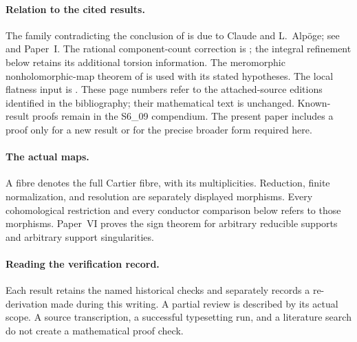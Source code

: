 \begin{abstract}
Let $f:Y\to B$ be a torus fibration from a smooth compact complex
threefold with $b_1(Y)=b_2(Y)=0$. We identify the cotangent torsion
and connecting homomorphism omitted in the singular-fibre reduction
of the Campana--Demailly--Peternell argument, and give the exact
geometric criterion for its degree-two tangent-cohomology vanishing.
The normalization target alone does not determine that cohomology:
the explicitly computed integral twists include a one-dimensional
source whose natural map to the one-dimensional target is zero.
For irreducible and normal-crossing supports, the local conductor,
monodromy and vanishing-cycle calculations give nonnegative fibre
Euler numbers and $c_3(Y)\in\{0,2\}$. The zero-Euler irreducible
singular supports have smooth minimal elliptic ruled or Hopf
normalization. We also prove the persistence of a rank-two torus
fibration under small deformations and retain the full period,
tangent-cohomology and deformation-chain calculations. The exact
comb kernel splitting remains an explicitly stated open problem.
\end{abstract}

\paragraph{Relation to the cited results.}
The family contradicting the conclusion of
\citet[Corollary~2.3, p.~2 of the attached-source edition]{CDP20} is due to Claude and L.~Alp\"oge;
see \citet[Theorem~9.1]{AC2026} and Paper~I.
The rational component-count correction is
\cite[Section~10.5, p.~91]{AC2026}; the integral refinement below
retains its additional torsion information. The meromorphic
nonholomorphic-map theorem of
\citet[Theorem~3.1, p.~9 of the attached-source edition]{LRS2019} is used with its stated hypotheses.
The local flatness input is
\cite[Theorem~2.2, p.~5 of the attached-source edition]{Viaclovsky2026Combs}.
These page numbers refer to the attached-source editions identified
in the bibliography; their mathematical text is unchanged.
Known-result proofs remain in the S6\_09 compendium. The present
paper includes a proof only for a new result or for the precise
broader form required here.

\paragraph{The actual maps.}
A fibre denotes the full Cartier fibre, with its multiplicities.
Reduction, finite normalization, and resolution are separately
displayed morphisms. Every cohomological restriction and every
conductor comparison below refers to those morphisms. Paper~VI
proves the sign theorem for arbitrary reducible supports and
arbitrary support singularities.

\paragraph{Reading the verification record.}
Each result retains the named historical checks and separately
records a re-derivation made during this writing. A partial review
is described by its actual scope. A source transcription, a
successful typesetting run, and a literature search do not create
a mathematical proof check.
